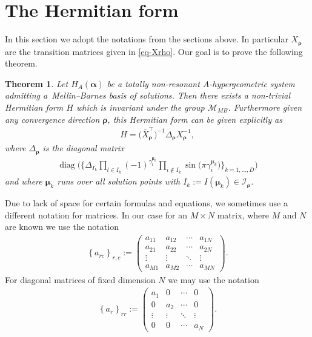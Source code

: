 \documentclass[pdftex]{sigma}
\numberwithin{equation}{section}
\newtheorem{Theorem}{Theorem}[section]
\begin{document}
\section{The Hermitian form}\label{chap-herm}
In this section we adopt the notations from the sections above. In particular $X_{\bm\rho}$ are the transition matrices given in \eqref{eq-Xrho}. Our goal is to prove the following theorem.

\begin{Theorem}\label{MB-Hermitian}
Let $H_A(\bm{\alpha})$ be a totally non-resonant $A$-hypergeometric system admitting a~Mel\-lin--Barnes basis of solutions. Then there exists a non-trivial Hermitian form $H$ which is inva\-riant under the group $\mathcal{M}_{MB}$. Furthermore given any convergence direction $\bm\rho$, this Hermitian form can be given explicitly as
\begin{gather*}
H = \big(\bar{X}_{\bm\rho}^{\intercal}\big)^{-1} \Delta_{\bm\rho} X_{\bm\rho}^{-1},%
\end{gather*}
where $\Delta_{\bm\rho}$ is the diagonal matrix
\begin{gather}
\operatorname{diag}\bigg(\bigg\{\Delta_{I_k} \prod_{l \in I_k} (-1)^{\gamma_l^{\bm\mu_k}}\prod_{i \not \in I_k} \sin\big(\pi \gamma_i^{\bm\mu_k}\big)\bigg\}_{k=1,\dots,D}\bigg)
\label{eq-deltarho}
\end{gather}
and where $\bm\mu_k$ runs over all solution points with $I_k := I(\bm{\mu}_k) \in \mathcal{I}_{\bm\rho}$.
\end{Theorem}

\begin{Note}
Due to lack of space for certain formulas and equations, we sometimes use a different notation for matrices. In our case for an $M\times N$ matrix, where $M$ and $N$ are known we use the notation \begin{gather*}
\left\{a_{rc}\right\}_{r,c} := \begin{pmatrix}a_{11} & a_{12} & \cdots & a_{1N} \\ a_{21} & a_{22} & \cdots & a_{2N} \\ \vdots & \vdots & \ddots & \vdots \\ a_{M1} & a_{M2} & \cdots & a_{MN} \end{pmatrix}\!.
\end{gather*}
For diagonal matrices of fixed dimension $N$ we may use the notation
\begin{gather*}
\left\{a_{r}\right\}_{rr} := \begin{pmatrix}a_{1} & 0 & \cdots & 0 \\ 0 & a_{2} & \cdots & 0 \\ \vdots & \vdots & \ddots & \vdots \\ 0 & 0 & \cdots & a_{N} \end{pmatrix}\!.
\end{gather*}
\end{Note}
\end{document}

